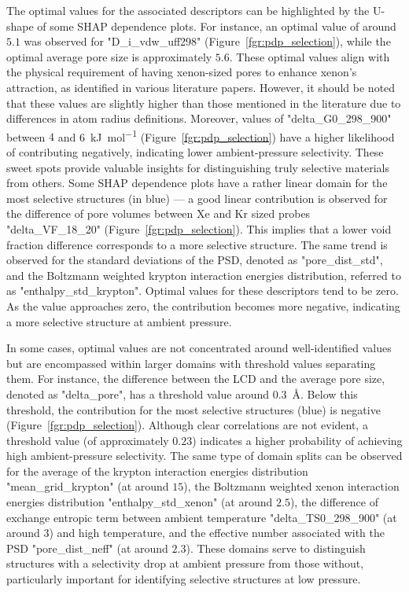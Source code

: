 \documentclass[main]{subfiles}
\begin{document}
The optimal values for the associated descriptors can be highlighted by the U-shape of some SHAP dependence plots. For instance, an optimal value of around $5.1$ was observed for "D\_i\_vdw\_uff298" (Figure~\ref{fgr:pdp_selection}), while the optimal average pore size is approximately $5.6$. These optimal values align with the physical requirement of having  xenon-sized pores to enhance xenon's attraction, as identified in various literature papers. However, it should be noted that these values are slightly higher than those mentioned in the literature due to differences in atom radius definitions.\autocite{Hung_2021} Moreover, values of "delta\_G0\_298\_900" between $4$ and \SI{6}{\kilo\joule\per\mole} (Figure~\ref{fgr:pdp_selection}) have a higher likelihood of contributing negatively, indicating lower ambient-pressure selectivity. These sweet spots provide valuable insights for distinguishing truly selective materials from others. Some SHAP dependence plots have a rather linear domain for the most selective structures (in blue) --- a good linear contribution is observed for the difference of pore volumes between Xe and Kr sized probes "delta\_VF\_18\_20" (Figure~\ref{fgr:pdp_selection}). This implies that a lower void fraction difference corresponds to a more selective structure.  The same trend is observed for the standard deviations of the PSD, denoted as  "pore\_dist\_std", and the Boltzmann weighted krypton interaction energies distribution, referred to as "enthalpy\_std\_krypton". Optimal values for these descriptors tend to be zero. As the value approaches zero, the contribution becomes more negative, indicating a more selective structure at ambient pressure. 

In some cases, optimal values are not concentrated around well-identified values but are encompassed within larger domains with threshold values separating them. For instance, the difference between the LCD and the average pore size, denoted as "delta\_pore", has a threshold value around \SI{0.3}{\angstrom}. Below this threshold, the contribution for the most selective structures (blue) is negative (Figure~\ref{fgr:pdp_selection}). Although clear correlations are not evident, a threshold value (of approximately $0.23$) indicates a higher probability of achieving high ambient-pressure selectivity. The same type of domain splits can be observed for the average of the krypton interaction energies distribution "mean\_grid\_krypton" (at around $15$), the Boltzmann weighted xenon interaction energies distribution "enthalpy\_std\_xenon" (at around $2.5$), the difference of exchange entropic term between ambient temperature "delta\_TS0\_298\_900" (at around $3$) and high temperature, and the effective number associated with the PSD "pore\_dist\_neff" (at around $2.3$). These domains serve to distinguish structures with a selectivity drop at ambient pressure from those without, particularly important for identifying selective structures at low pressure.
\end{document}

